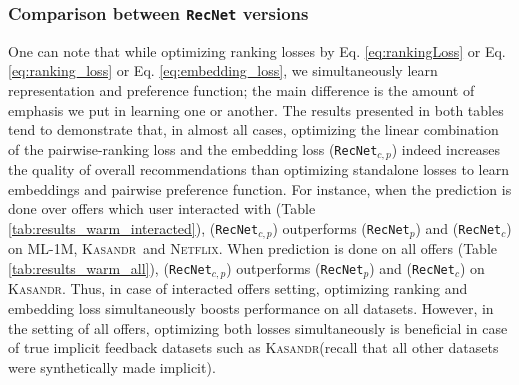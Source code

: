 \documentclass[10pt,journal,compsoc]{IEEEtran}
\newcommand{\NetF}{\textsc{Netflix}}
\newcommand{\ML}{\textsc{ML}}
\newcommand{\RecNet}{\texttt{RecNet}}
\newcommand{\BPR}{\texttt{BPR-MF}}
\newcommand{\kasandr}{\textsc{Kasandr}}
\newcommand{\cmmnt}[1]{}
\begin{document}
\begin{sloppypar}
\subsubsection*{Comparison between {\RecNet} versions}
One can note that while optimizing ranking losses by Eq. \ref{eq:rankingLoss} or Eq. \ref{eq:ranking_loss} or Eq. \ref{eq:embedding_loss}, we simultaneously learn representation and preference function; the main difference is the amount of emphasis we put in learning one or another. The results presented in both tables tend to demonstrate that, in almost all cases, optimizing the linear combination of the pairwise-ranking loss and the embedding loss ({\RecNet}$_{c,p}$) indeed increases the quality of overall recommendations than optimizing standalone losses to learn embeddings and pairwise preference function. For instance, when the prediction is done over offers which user interacted with (Table \ref{tab:results_warm_interacted}), ({\RecNet}$_{c,p}$) outperforms ({\RecNet}$_{p}$) and ({\RecNet}$_{c}$) on \ML-1M, \kasandr\ and \NetF. When prediction is done on all offers (Table \ref{tab:results_warm_all}), ({\RecNet}$_{c,p}$) outperforms ({\RecNet}$_{p}$) and ({\RecNet}$_{c}$) on \kasandr. Thus, in case of interacted offers setting, optimizing ranking and embedding loss simultaneously boosts performance on all datasets. However, in the setting of  all offers, optimizing both losses simultaneously is beneficial in case of true implicit feedback datasets such as \kasandr (recall that all other datasets were synthetically made implicit). \cmmnt{In the setting of predicting over all offers, learning a good representation/embeddings alone and ignoring preference loss function seems to be doing the trick for a good performance for such synthetically modified data sets.}

\end{sloppypar}
\end{document}
